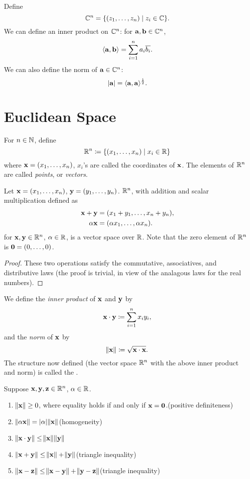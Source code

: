\begin{mdframed}
Define
\[\mathbb C^n=\{(z_1,\dots,z_n)\mid z_i\in\mathbb C\}.\]
We can define an inner product on $\mathbb C^n$: for $\vb{a},\vb{b}\in\mathbb C^n$,
\[\langle\vb{a},\vb{b}\rangle=\sum_{i=1}^{n}a_i\overline{b_i}.\]
We can also define the norm of $\vb{a}\in\mathbb C^n$:
\[|\vb{a}|=\langle\vb{a},\vb{a}\rangle^\frac{1}{2}.\]
\end{mdframed}
\pagebreak

\section{Euclidean Space}
For $n\in\mathbb N$, define
\[\mathbb R^n\coloneqq\{(x_1,\dots,x_n)\mid x_i\in\mathbb R\}\]
where $\vb{x}=(x_1,\dots,x_n)$, $x_i$'s are called the coordinates of $\vb{x}$. The elements of $\mathbb R^n$ are called \emph{points}, or \emph{vectors}.

\begin{lemma}
Let $\vb{x}=(x_1,\dots,x_n)$, $\vb{y}=(y_1,\dots,y_n)$. $\mathbb R^n$, with addition and scalar multiplication defined as
\begin{align*}
\vb{x}+\vb{y}&=(x_1+y_1,\dots,x_n+y_n),\\
\alpha\vb{x}&=(\alpha x_1,\dots,\alpha x_n).
\end{align*}
for $\vb{x},\vb{y}\in\mathbb R^n$, $\alpha\in\mathbb R$, is a vector space over $\mathbb R$. Note that the zero element of $\mathbb R^n$ is $\vb{0}=(0,\dots,0)$.
\end{lemma}

\begin{proof}
These two operations satisfy the commutative, associatives, and distributive laws (the proof is trivial, in view of the analagous laws for the real numbers).
\end{proof}

We define the \emph{inner product} of $\vb{x}$ and $\vb{y}$ by
\[\vb{x}\cdot\vb{y}\coloneqq\sum_{i=1}^nx_iy_i,\]
and the \emph{norm} of $\vb{x}$ by
\[\norm{\vb{x}}\coloneqq\sqrt{\vb{x}\cdot\vb{x}}.\]
The structure now defined (the vector space $\mathbb R^n$ with the above inner product and norm) is called the .

\begin{lemma}
Suppose $\vb{x},\vb{y},\vb{z}\in\mathbb R^n$, $\alpha\in\mathbb R$.
\begin{enumerate}[label=(\roman*)]
\item $\norm{\vb{x}}\ge0$, where equality holds if and only if $\vb{x}=\vb{0}$.\hfill(positive definiteness)
\item $\norm{\alpha\vb{x}}=|\alpha|\norm{\vb{x}}$\hfill(homogeneity)
\item $\norm{\vb{x}\cdot\vb{y}}\le\norm{\vb{x}}\norm{\vb{y}}$
\item $\norm{\vb{x}+\vb{y}}\le\norm{\vb{x}}+\norm{\vb{y}}$\hfill(triangle inequality)
\item $\norm{\vb{x}-\vb{z}}\le\norm{\vb{x}-\vb{y}}+\norm{\vb{y}-\vb{z}}$\hfill(triangle inequality)
\end{enumerate}
\end{lemma}

